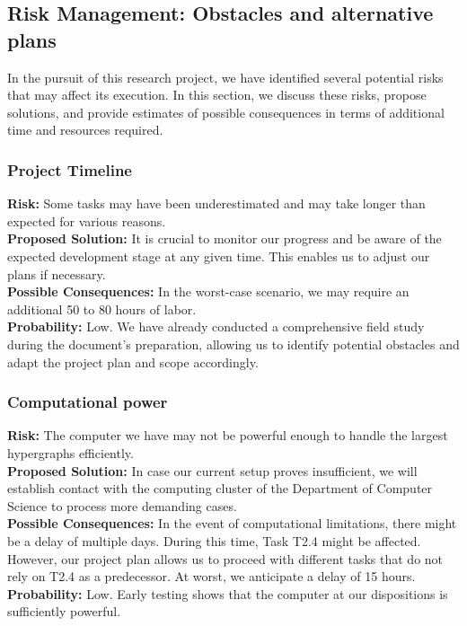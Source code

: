 \subsection{Risk Management: Obstacles and alternative plans}
In the pursuit of this research project, we have identified several potential risks that may affect its execution. In this section, we discuss these risks, propose solutions, and provide estimates of possible consequences in terms of additional time and resources required.\\
\subsubsection{Project Timeline}

    \textbf{Risk:} Some tasks may have been underestimated and may take longer than expected for various reasons.\\
    \textbf{Proposed Solution:} It is crucial to monitor our progress and be aware of the expected development stage at any given time. This enables us to adjust our plans if necessary.\\
    \textbf{Possible Consequences:} In the worst-case scenario, we may require an additional 50 to 80 hours of labor.\\
    \textbf{Probability:} Low. We have already conducted a comprehensive field study during the document's preparation, allowing us to identify potential obstacles and adapt the project plan and scope accordingly.
    
\subsubsection{Computational power}

    \textbf{Risk:} The computer we have may not be powerful enough to handle the largest hypergraphs efficiently.\\
    \textbf{Proposed Solution:} In case our current setup proves insufficient, we will establish contact with the computing cluster of the Department of Computer Science to process more demanding cases.\\
    \textbf{Possible Consequences:} In the event of computational limitations, there might be a delay of multiple days. During this time, Task T2.4 might be affected. However, our project plan allows us to proceed with different tasks that do not rely on T2.4 as a predecessor. At worst, we anticipate a delay of 15 hours.\\
    \textbf{Probability:} Low. Early testing shows that the computer at our dispositions is sufficiently powerful.
    
